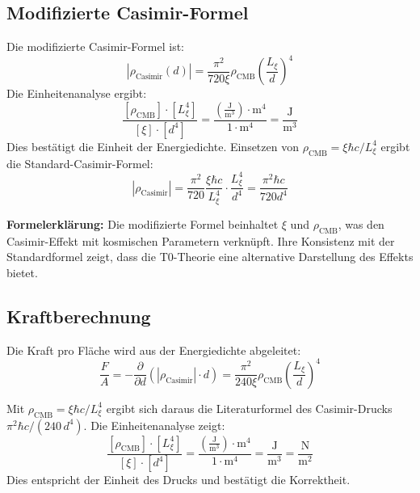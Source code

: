 	\subsection{Modifizierte Casimir-Formel}
	Die modifizierte Casimir-Formel ist:
	\begin{equation}
		|\rho_{\text{Casimir}}(d)| = \frac{\pi^2}{720 \xi} \rho_{\text{CMB}} \left( \frac{L_\xi}{d} \right)^4
	\end{equation}
	Die Einheitenanalyse ergibt:
	\begin{equation}
		\frac{[\rho_{\text{CMB}}] \cdot [L_\xi^4]}{[\xi] \cdot [d^4]} = \frac{\left( \frac{\text{J}}{\text{m}^3} \right) \cdot \text{m}^4}{1 \cdot \text{m}^4} = \frac{\text{J}}{\text{m}^3}
	\end{equation}
	Dies bestätigt die Einheit der Energiedichte. Einsetzen von $\rho_{\text{CMB}} = \xi \hbar c / L_\xi^4$ ergibt die Standard-Casimir-Formel:
	\begin{equation}
		|\rho_{\text{Casimir}}| = \frac{\pi^2}{720} \frac{\xi \hbar c}{L_\xi^4} \cdot \frac{L_\xi^4}{d^4} = \frac{\pi^2 \hbar c}{720 d^4}
	\end{equation}
	
	\textbf{Formelerklärung:} Die modifizierte Formel beinhaltet $\xi$ und $\rho_{\text{CMB}}$, was den Casimir-Effekt mit kosmischen Parametern verknüpft. Ihre Konsistenz mit der Standardformel zeigt, dass die T0-Theorie eine alternative Darstellung des Effekts bietet.
	
	\subsection{Kraftberechnung}
	Die Kraft pro Fläche wird aus der Energiedichte abgeleitet:
	\begin{equation}
		\frac{F}{A} = -\frac{\partial}{\partial d} \left( |\rho_{\text{Casimir}}| \cdot d \right) = \frac{\pi^2}{240 \xi} \rho_{\text{CMB}} \left( \frac{L_\xi}{d} \right)^4
	\end{equation}
	
	Mit $\rho_{\text{CMB}} = \xi\hbar c/L_\xi^4$ ergibt sich daraus die Literaturformel des Casimir-Drucks $\pi^2\hbar c/(240\,d^4)$.
	Die Einheitenanalyse zeigt:
	\begin{equation}
		\frac{[\rho_{\text{CMB}}] \cdot [L_\xi^4]}{[\xi] \cdot [d^4]} = \frac{\left( \frac{\text{J}}{\text{m}^3} \right) \cdot \text{m}^4}{1 \cdot \text{m}^4} = \frac{\text{J}}{\text{m}^3} = \frac{\text{N}}{\text{m}^2}
	\end{equation}
	Dies entspricht der Einheit des Drucks und bestätigt die Korrektheit.
	

